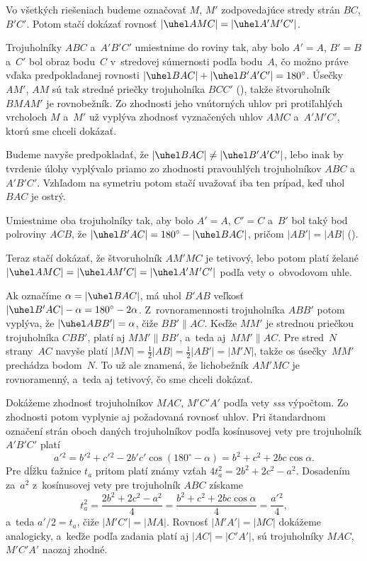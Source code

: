 {%
Vo všetkých riešeniach budeme označovať $M$, $M'$ zodpovedajúce stredy strán $BC$,
$B'C'$. Potom stačí dokázať rovnosť $|\uhel AMC|=|\uhel A'M'C'|$.

\nres
Trojuholníky $ABC$ a~$A'B'C'$ umiestnime do roviny tak, aby bolo $A'=A$,
$B'=B$ a~$C'$ bol obraz bodu~$C$ v~stredovej súmernosti podľa bodu~$A$,
čo možno práve vďaka predpokladanej rovnosti
$|\uhel BAC| + |\uhel B'A'C'| =180^\circ$.
Úsečky $AM'$, $AM$ sú tak stredné priečky
trojuholníka $BCC'$ (\obr), takže štvoruholník $BMAM'$ je rovnobežník.
Zo zhodnosti jeho vnútorných uhlov pri protiľahlých vrcholoch $M$ a~$M'$ už vyplýva
zhodnosť vyznačených uhlov $AMC$ a~$A'M'C'$, ktorú sme chceli dokázať.
%

\nres
Budeme navyše predpokladať, že $|\uhel BAC| \ne |\uhel B'A'C'|$, lebo
inak by tvrdenie úlohy vyplývalo priamo zo zhodnosti pravouhlých trojuholníkov
$ABC$ a~$A'B'C'$. Vzhľadom na symetriu potom stačí uvažovať iba
ten prípad, keď uhol $BAC$ je ostrý.

Umiestnime oba trojuholníky tak, aby bolo $A'=A$, $C'=C$ a~$B'$ bol taký bod
polroviny $ACB$, že $|\uhel B'AC|=180^\circ-|\uhel BAC|$, pričom
$|AB'|=|AB|$ (\obr).
%

Teraz stačí dokázať, že štvoruholník $AM'MC$ je tetivový, lebo potom platí
želané $|\uhel AMC|=|\uhel AM'C|=|\uhel A'M'C'|$ podľa vety o~obvodovom uhle.

Ak označíme $\alpha=|\uhel BAC|$, má uhol $B'AB$ veľkosť
$|\uhel B'AC| - \alpha = 180^\circ-2\alpha$. Z~rovnoramennosti
trojuholníka $ABB'$ potom vyplýva, že $|\uhel ABB'|=\alpha$, čiže $BB'
\parallel AC$. Keďže $MM'$ je strednou priečkou trojuholníka $CBB'$,
platí aj $MM' \parallel BB'$, a~teda aj~$MM' \parallel AC$. Pre stred~$N$ strany~$AC$ navyše platí $|MN|=\frac12 |AB| = \frac12 |AB'|= |M'N|$,
takže os úsečky~$MM'$ prechádza bodom~$N$. To už ale znamená, že
lichobežník $AM'MC$ je rovnoramenný, a~teda aj tetivový, čo sme
chceli dokázať.

\nres
Dokážeme zhodnosť trojuholníkov $MAC$, $M'C'A'$ podľa vety {\it sss} výpočtom.
Zo zhodnosti potom vyplynie aj požadovaná rovnosť uhlov.
Pri štandardnom označení strán oboch daných trojuholníkov
podľa kosínusovej vety pre trojuholník $A'B'C'$ platí
$$
a'{}^2=b'{}^2+c'{}^2-2b'c' \cos(180^\circ-\alpha)=b^2+c^2+2bc \cos \alpha.
$$
Pre dĺžku ťažnice $t_a$ pritom platí známy vzťah $4t_a^2=2b^2+2c^2-a^2$.
Dosadením za~$a^2$ z~kosínusovej vety pre trojuholník $ABC$ získame
$$
t_a^2=\frac{2b^2+2c^2-a^2}{4}
=\frac{b^2+c^2+2bc\cos \alpha}{4} =\frac{a'{}^2}{4},
$$
a~teda $a'/2=t_a$, čiže $|M'C'|=|MA|$. Rovnosť $|M'A'|=|MC|$ dokážeme
analogicky, a~keďže podľa zadania platí aj $|AC|=|C'A'|$, sú
trojuholníky $MAC$, $M'C'A'$ naozaj zhodné.

}
